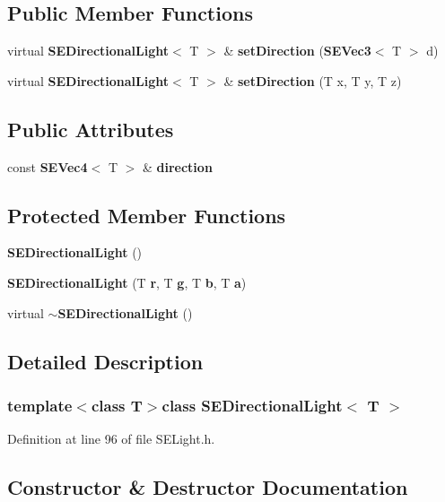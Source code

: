 \subsection*{Public Member Functions}
\begin{DoxyCompactItemize}
\item 
virtual {\bf S\+E\+Directional\+Light}$<$ T $>$ \& {\bf set\+Direction} ({\bf S\+E\+Vec3}$<$ T $>$ d)
\item 
virtual {\bf S\+E\+Directional\+Light}$<$ T $>$ \& {\bf set\+Direction} (T x, T y, T z)
\end{DoxyCompactItemize}
\subsection*{Public Attributes}
\begin{DoxyCompactItemize}
\item 
const {\bf S\+E\+Vec4}$<$ T $>$ \& {\bf direction}
\end{DoxyCompactItemize}
\subsection*{Protected Member Functions}
\begin{DoxyCompactItemize}
\item 
{\bf S\+E\+Directional\+Light} ()
\item 
{\bf S\+E\+Directional\+Light} (T {\bf r}, T {\bf g}, T {\bf b}, T {\bf a})
\item 
virtual {\bf $\sim$\+S\+E\+Directional\+Light} ()
\end{DoxyCompactItemize}


\subsection{Detailed Description}
\subsubsection*{template$<$class T$>$class S\+E\+Directional\+Light$<$ T $>$}



Definition at line 96 of file S\+E\+Light.\+h.



\subsection{Constructor \& Destructor Documentation}
